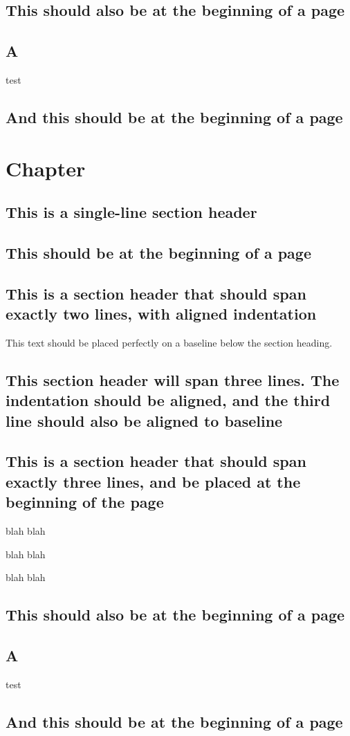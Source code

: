 \documentclass[baselinegrid]{uit-thesis}
\begin{document}
\section{This should also be at the beginning of a page}
\section{A}
test

\newpage
\section{And this should be at the beginning of a page}


\chapter{Chapter}
\lipsum[1]

\section{This is a single-line section header}
\lipsum[3-7]

\section{This should be at the beginning of a page}
\lipsum[8]

\section{This is a section header that should span exactly two lines, with aligned indentation}
This text should be placed perfectly on a baseline below the section heading.

\lipsum[9]

\section{This section header will span three lines. The indentation should be aligned, and the third line should also be aligned to baseline}
\lipsum[10-14]

\section{This is a section header that should span exactly three lines, and be placed at the beginning of the page}

\lipsum[15-17]

blah blah

blah blah

blah blah



\section{This should also be at the beginning of a page}
\section{A}
test

\newpage
\section{And this should be at the beginning of a page}
\end{document}
